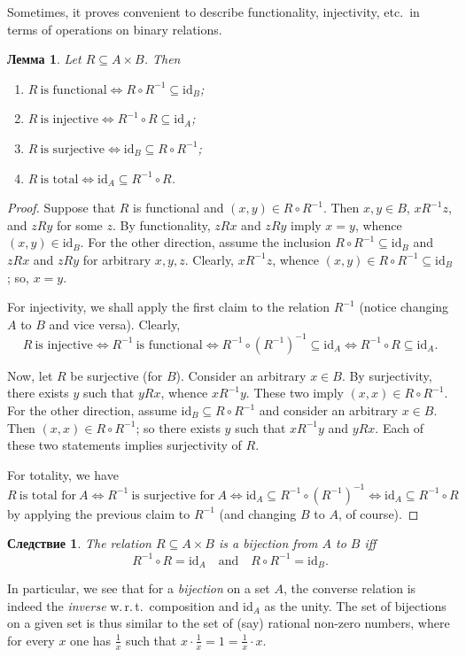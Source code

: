 \documentclass[12pt,notitlepage]{article}
\theoremstyle{plain}
\newtheorem{lemma}[thm]{Лемма}
\newtheorem{corr}[thm]{Следствие}
\theoremstyle{definition}
\theoremstyle{plain}
\newcommand{\sbs}{\subseteq}
\newcommand{\id}{\mathrm{id}}
\newcommand{\1}{\mathbf{1}}
\newcommand{\0}{\mathbf{0}}
\begin{document}
Sometimes, it proves convenient to describe functionality, injectivity, etc.\ in terms of operations on binary relations.
\begin{lemma}\label{rel:fnc_algebra}
	Let $R \sbs A \times B$. Then
	\begin{enumerate}
		\item $R\ \mbox{is functional} \iff R \circ R^{-1} \sbs \id_B$;
		\item $R\ \mbox{is injective} \iff R^{-1} \circ R \sbs \id_A$;
		\item $R\ \mbox{is surjective} \iff \id_B \sbs R \circ R^{-1}$;
		\item $R\ \mbox{is total} \iff \id_A \sbs R^{-1} \circ R$.
	\end{enumerate}
\end{lemma}
\begin{proof}
	Suppose that $R$ is functional and $(x, y) \in R \circ R^{-1}$. Then $x, y \in B$, $x R^{-1} z$, and $z R y$ for some $z$. By functionality, $z R x$ and $z R y$ imply $x = y$, whence $(x, y) \in \id_B$. For the other direction, assume the inclusion $R \circ R^{-1} \sbs \id_B$ and $z R x$ and $z R y$ for arbitrary $x, y, z$. Clearly, $x R^{-1} z$, whence $(x, y) \in R \circ R^{-1} \sbs \id_B$; so, $x = y$.
	
	For injectivity, we shall apply the first claim to the relation $R^{-1}$ (notice changing $A$ to $B$ and vice versa). Clearly,
	$$R\ \mbox{is injective} \iff R^{-1}\ \mbox{is functional} \iff R^{-1} \circ (R^{-1})^{-1} \sbs \id_A \iff R^{-1} \circ R \sbs \id_A.$$
	
	Now, let $R$ be surjective (for $B$). Consider an arbitrary $x \in B$. By surjectivity, there exists $y$ such that $y R x$, whence $x R^{-1} y$. These two imply $(x, x) \in R  \circ R^{-1}$. For the other direction, assume $\id_B \sbs R \circ R^{-1}$ and consider an arbitrary $x \in B$. Then $(x, x) \in R \circ R^{-1}$; so there exists $y$ such that $x R^{-1} y$ and $y R x$. Each of these two statements implies surjectivity of $R$.
	
	For totality, we have
	$$R\ \mbox{is total for}\ A \iff R^{-1}\ \mbox{is surjective for}\ A \iff \id_A \sbs R^{-1} \circ (R^{-1})^{-1} \iff \id_A \sbs R^{-1} \circ R$$
	by applying the previous claim to $R^{-1}$ (and changing $B$ to $A$, of course).
\end{proof}

\begin{corr}\label{ch0:bi_cmp}
	The relation $R \sbs A \times B$ is a bijection from $A$ to $B$ iff
	$$R^{-1}\circ R = \id_A\quad \mbox{and}\quad R \circ R^{-1} = \id_B.$$
\end{corr}
In particular, we see that for a \emph{bijection} on a set $A$, the converse relation is indeed the \emph{inverse} w.\,r.\,t.\ composition and $\id_A$ as the unity. The set of bijections on a given set is thus similar to the set of (say) rational non-zero numbers, where for every $x$ one has $\frac{1}{x}$ such that $x \cdot \frac{1}{x} = 1 = \frac{1}{x} \cdot x$.
\end{document}
